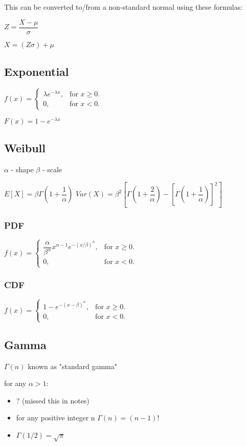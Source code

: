 \documentclass[12pt,fleqn]{article}
\begin{document}
This can be converted to/from a non-standard normal using these formulas:

$Z = \dfrac{X-\mu}{\sigma}$


$X = (Z \sigma) + \mu$


\subsection{Exponential}


$
f(x)=\begin{cases}
\lambda e^{-\lambda x}, & \text{for $x\ge0$}.\\
0, & \text{for $x<0$}.
\end{cases}
$

$ F(x)=1-e^{-\lambda x} $


\subsection{Weibull}

$\alpha$ - shape
$\beta$ - scale

$E[X] = \beta\Gamma(1+\dfrac{1}{\alpha})$
$Var(X) = \beta^2[\Gamma(1+\dfrac{2}{\alpha})-[\Gamma(1+\dfrac{1}{\alpha})]^2]$

\subsubsection{PDF}

$
f(x)=\begin{cases}
\dfrac{\alpha}{\beta^\alpha}x^{\alpha-1}e^{-(x/\beta)^\alpha}, & \text{for $x\ge0$}.\\
0, & \text{for $x<0$}.
\end{cases}
$

\subsubsection{CDF}

$
f(x)=\begin{cases}
1-e^{-(x-\beta)^\alpha}, & \text{for $x\ge0$}.\\
0, & \text{for $x<0$}.
\end{cases}
$


\subsection{Gamma}

$\Gamma(n)$ known as "standard gamma"


for any $\alpha > 1$:
\begin{itemize}
	\item ? (missed this in notes)
	\item for any positive integer n $\Gamma(n) = (n-1)!$
	\item $\Gamma(1/2) = \sqrt{\pi}$
\end{itemize}
\end{document}
